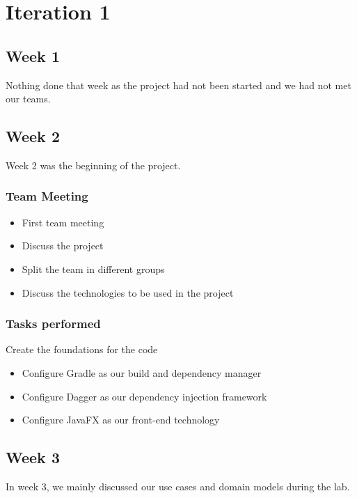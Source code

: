 \documentclass[12pt]{article}
\begin{document}
\maketitle

\section{Iteration 1}
\subsection{Week 1}
Nothing done that week as the project had not been started and we had not met our teams.

\subsection{Week 2}
Week 2 was the beginning of the project.

\subsubsection{Team Meeting}
\begin{itemize}
    \item First team meeting
    \item Discuss the project
    \item Split the team in different groups
    \item Discuss the technologies to be used in the project
\end{itemize}

\subsubsection{Tasks performed}
\item Create the foundations for the code
\begin{itemize}
    \item Configure Gradle as our build and dependency manager
    \item Configure Dagger as our dependency injection framework
    \item Configure JavaFX as our front-end technology
\end{itemize}

\subsection{Week 3}
In week 3, we mainly discussed our use cases and domain models during the lab.
\end{document}
